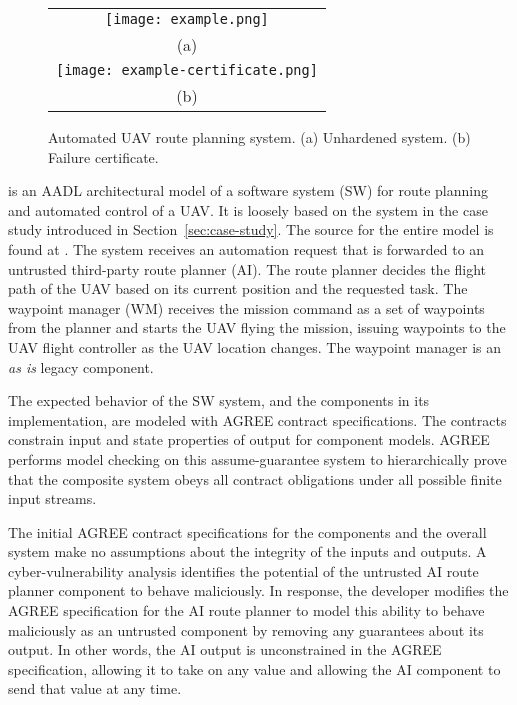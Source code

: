 \begin{figure*}
  \begin{center}
    \begin{tabular}{c}
      \texttt{[image: example.png]} \\
      (a) \\
      \texttt{[image: example-certificate.png]} \\
      (b)
    \end{tabular}
  \end{center}
\caption{Automated UAV route planning system. (a) Unhardened system. (b) Failure certificate.}
\label{fig:example}
\end{figure*}

 is an AADL architectural model of a software system (SW) for route planning and automated control of a UAV. It is loosely based on the system in the case study introduced in Section~\ref{sec:case-study}.  The source for the entire model is found at \cite{repo}. The system receives an automation request that is forwarded to an untrusted third-party route planner (AI).  The route planner decides the flight path of the UAV based on its current position and the requested task. The waypoint manager (WM) receives the mission command as a set of waypoints from the planner and starts the UAV flying the mission, issuing waypoints to the UAV flight controller as the UAV location changes. The waypoint manager is an \emph{as is} legacy component.

The expected behavior of the SW system, and the components in its implementation, are modeled with AGREE contract specifications. The contracts constrain input and state properties of output for component models. AGREE performs model checking on this assume-guarantee system to hierarchically prove that the composite system obeys all contract obligations under all possible finite input streams. 

The initial AGREE contract specifications for the components and the overall system make no assumptions about the integrity of the inputs and outputs. A cyber-vulnerability analysis identifies the potential of the untrusted AI route planner component to behave maliciously. In response, the developer modifies the AGREE specification for the AI route planner to model this ability to behave maliciously as an untrusted component by removing any guarantees about its output.  In other words, the AI output is unconstrained in the AGREE specification, allowing it to take on any value and allowing the AI component to send that value at any time.

